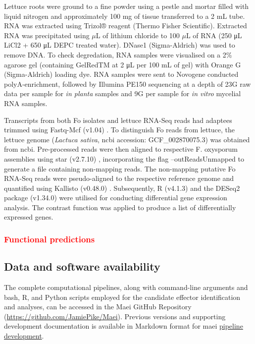 Lettuce roots were ground to a fine powder using a pestle and mortar filled with liquid nitrogen and approximately 100 mg of tissue transferred to a 2 mL tube. RNA was extracted using Trizol® reagent (Thermo Fisher Scientific). Extracted RNA was precipitated using \(\mu\)L of lithium chloride to 100 \(\mu\)L of RNA (250 μL LiCl2 + 650 μL DEPC treated water). DNase1 (Sigma-Aldrich) was used to remove DNA. To check degredation, RNA samples were visualised on a 2\% agarose gel (containing GelRedTM at 2 μL per 100 mL of gel) with Orange G (Sigma-Aldrich) loading dye. RNA samples were sent to  Novogene conducted polyA-enrichment, followed by Illumina PE150 sequencing at a depth of 23G raw data per sample for \textit{in planta} samples and 9G per sample for \textit{in vitro} mycelial RNA samples.

Transcripts from both \ac{Fo} isolates and lettuce RNA-Seq reads had  adaptees trimmed using Fastq-Mcf (v1.04) \parencite{Aronesty2013}. To distinguish \ac{Fo} reads from lettuce, the lettuce genome (\textit{Lactuca sativa}, \ac{ncbi} accession: GCF\_002870075.3) was obtained from \ac{ncbi}. Pre-processed reads were then aligned to respective F. oxysporum assemblies using \ac{star} (v2.7.10) \parencite{Dobin2013}, incorporating the flag --outReadsUnmapped to generate a file containing non-mapping reads. The non-mapping putative \ac{Fo} RNA-Seq reads were pseudo-aligned to the respective reference genome and quantified using Kallisto (v0.48.0) \parencite{Bray2016}. Subsequently, R (v4.1.3) \parencite{R} and the DESeq2 package (v1.34.0) \parencite{Love2014} were utilised for conducting differential gene expression analysis. The contrast function was applied to produce a list of differentially expressed genes.

\subsubsection{\textcolor{red}{Functional predictions}}

\subsection{Data and software availability}

The complete computational pipelines, along with command-line arguments and bash, R, and Python scripts employed for the candidate effector identification and analyses, can be accessed in the Maei GitHub Repository (\href{https://github.com/JamiePike/Maei}{https://github.com/JamiePike/Maei}). Previous versions and supporting development documentation is available in Markdown format for \ac{maei} \href{https://github.com/JamiePike/Maei/tree/main/dev}{pipeline development}.

